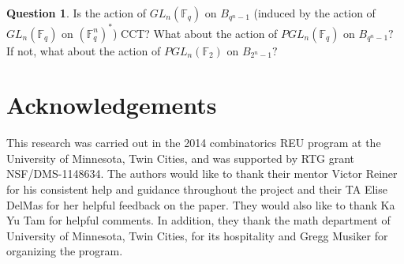 \documentclass[10 pt]{amsart}
\theoremstyle{plain}
\theoremstyle{definition}
\newtheorem{question}[thm]{Question}
\theoremstyle{remark}
\numberwithin{equation}{section}
\newcommand\BF{{\mathbb F}}
\begin{document}
\begin{question}
Is the action of $GL_n(\BF_q)$ on $B_{q^n-1}$ (induced by the action of $GL_n(\BF_q)$ on $(\BF_q^n)^*$) CCT? What about the action of $PGL_n(\BF_q)$ on $B_{q^n-1}?$ If not, what about the action of $PGL_n(\BF_2)$ on $B_{2^n-1}?$ 
\end{question}

\section*{Acknowledgements}
This research was carried out in the 2014 combinatorics REU program at the University of Minnesota, Twin Cities, and was supported by RTG grant NSF/DMS-1148634.
The authors would like to thank their mentor Victor Reiner for his consistent help and guidance throughout the project and their TA Elise DelMas for her helpful feedback on the paper. They would also like to thank Ka Yu Tam for helpful comments.  In addition, they thank the math department of University of Minnesota, Twin Cities, for its hospitality and Gregg Musiker for organizing the program.



\end{document}
